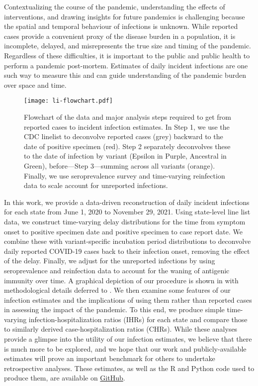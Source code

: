 Contextualizing the course of the pandemic, understanding the effects of
interventions, and drawing insights for future pandemics is challenging because
the spatial and temporal behaviour of infections is unknown. While reported
cases provide a convenient proxy of the disease burden in a population, it is
incomplete, delayed, and misrepresents the true size and timing of the pandemic.
Regardless of these difficulties, it is important to the public and public
health to perform a pandemic post-mortem. Estimates of daily incident infections
are one such way to measure this and can guide understanding of the pandemic
burden over space and time. 

\begin{figure}[!b]
\centering
    \texttt{[image: li-flowchart.pdf]} 
    \caption{Flowchart of the data and major analysis steps required to get from
    reported cases to incident infection estimates. In Step 1, we use the CDC
    linelist to deconvolve reported cases (grey) backward to the date of
    positive specimen (red). Step 2 separately deconvolves these to the date of
    infection by variant (Epsilon in Purple, Ancestral in Green), before---Step
    3---summing across all variants (orange). Finally, we use seroprevalence
    survey and time-varying reinfection data to scale account for unreported
    infections.}
    \label{fig:cases_to_infect_flowchart}
\end{figure}
    

In this work, we provide a data-driven reconstruction of daily incident
infections for each \US state from June 1, 2020 to November 29, 2021. Using
state-level line list data, we construct time-varying delay distributions for
the time from symptom onset to positive specimen date and positive specimen to
case report date. We combine these with variant-specific incubation period
distributions to deconvolve daily reported COVID-19 cases back to their
infection onset, removing the effect of the delay. Finally, we adjust for the
unreported infections by using seroprevalence and reinfection data to account
for the waning of antigenic immunity over time. A graphical depiction of our
procedure is shown in  with methodological
details deferred to . We then examine some features of our
infection estimates and the implications of using them rather than reported
cases in assessing the impact of the pandemic. To this end, we produce simple
time-varying infection-hospitalization ratios (IHRs) for each state and compare
those to similarly derived case-hospitalization ratios (CHRs). While these
analyses provide a glimpse into the utility of our infection estimates, we
believe that there is much more to be explored, and we hope that our work and
publicly-available estimates will prove an important benchmark for others to
undertake retrospective analyses. These estimates, as well as the R and Python
code used to produce them, are available on
\href{https://github.com/cmu-delphi/latent-infections/}{GitHub}.

